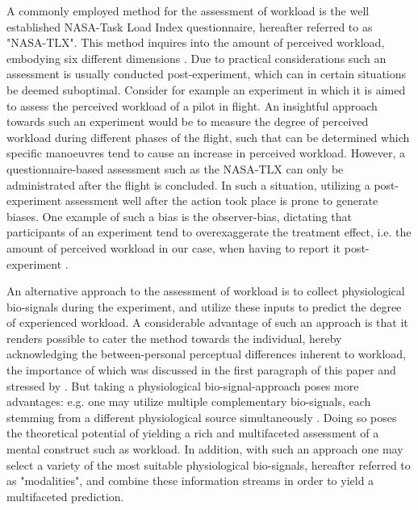 \documentclass[12pt]{article}
\begin{document}
A commonly employed method for the assessment of workload is the well established NASA-Task Load Index questionnaire, hereafter referred to as "NASA-TLX". This method inquires into the amount of perceived workload,  embodying six different dimensions \cite{hart2006nasa}. Due to practical considerations such an assessment is usually conducted post-experiment, which can in certain situations be deemed suboptimal. Consider for example an experiment in which it is aimed to assess the perceived workload of a pilot in flight. An insightful  approach towards such an experiment would be to measure the degree of perceived workload during different phases of the flight, such that can be determined which specific manoeuvres tend to cause an increase in perceived workload.  However,  a questionnaire-based assessment such as the NASA-TLX can only be administrated after the flight is concluded. In such a situation, utilizing a post-experiment assessment well after the action took place is prone to generate biases. One example of such a bias is the observer-bias, dictating that participants of an experiment tend to overexaggerate the treatment effect, i.e. the amount of perceived workload in our case, when having to report it post-experiment \cite{mahtani2018catalogue}.

An alternative approach to the assessment of workload is to collect physiological bio-signals during the experiment, and utilize these inputs to predict the degree of experienced workload.  A considerable advantage of such an approach is that it renders possible to cater the method towards the individual,  hereby acknowledging the between-personal perceptual differences inherent to workload, the importance of which was discussed in the first paragraph of this paper and stressed by . But taking a physiological bio-signal-approach poses more advantages: e.g. one may utilize multiple complementary bio-signals, each stemming from a different physiological source simultaneously \cite{ramachandram2017deep}. Doing so poses the theoretical potential of yielding a rich and multifaceted assessment of a mental construct such as workload. In addition, with such an approach one may select a variety of the most suitable physiological bio-signals, hereafter referred to as "modalities",  and combine these information streams in order to yield a multifaceted prediction.
\end{document}
